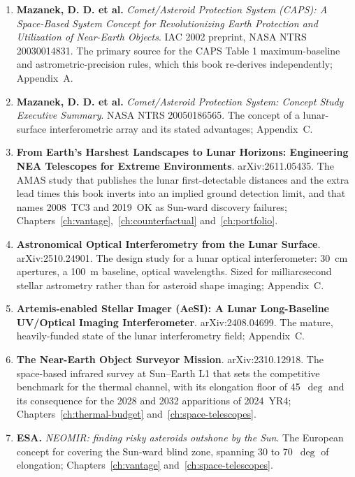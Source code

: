 \begin{enumerate}[leftmargin=2.9em,itemsep=4pt,resume]

\item \textbf{Mazanek, D. D. et al.} \emph{Comet/Asteroid Protection System
(CAPS): A Space-Based System Concept for Revolutionizing Earth Protection
and Utilization of Near-Earth Objects}. IAC 2002 preprint, NASA NTRS
20030014831. The primary source for the CAPS Table 1 maximum-baseline and
astrometric-precision rules, which this book re-derives independently;
Appendix~A.

\item \textbf{Mazanek, D. D. et al.} \emph{Comet/Asteroid Protection System:
Concept Study Executive Summary}. NASA NTRS 20050186565. The concept of a
lunar-surface interferometric array and its stated advantages;
Appendix~C.

\item \textbf{From Earth's Harshest Landscapes to Lunar Horizons: Engineering
NEA Telescopes for Extreme Environments}. arXiv:2611.05435. The AMAS study
that publishes the lunar first-detectable distances and the extra lead times
this book inverts into an implied ground detection limit, and that names
2008~TC3 and 2019~OK as Sun-ward discovery failures;
Chapters~\ref{ch:vantage},~\ref{ch:counterfactual} and~\ref{ch:portfolio}.

\item \textbf{Astronomical Optical Interferometry from the Lunar Surface}.
arXiv:2510.24901. The design study for a lunar optical interferometer: 30~cm
apertures, a 100~m baseline, optical wavelengths. Sized for milliarcsecond
stellar astrometry rather than for asteroid shape imaging;
Appendix~C.

\item \textbf{Artemis-enabled Stellar Imager (AeSI): A Lunar Long-Baseline
UV/Optical Imaging Interferometer}. arXiv:2408.04699. The mature,
heavily-funded state of the lunar interferometry field;
Appendix~C.

\item \textbf{The Near-Earth Object Surveyor Mission}. arXiv:2310.12918. The
space-based infrared survey at Sun--Earth L1 that sets the competitive
benchmark for the thermal channel, with its elongation floor of
45~$\deg$ and its consequence for the 2028 and 2032 apparitions of 2024~YR4;
Chapters~\ref{ch:thermal-budget} and~\ref{ch:space-telescopes}.

\item \textbf{ESA.} \emph{NEOMIR: finding risky asteroids outshone by the
Sun}. The European concept for covering the Sun-ward blind zone, spanning
30 to 70~$\deg$ of elongation; Chapters~\ref{ch:vantage} and~\ref{ch:space-telescopes}.


\end{enumerate}
